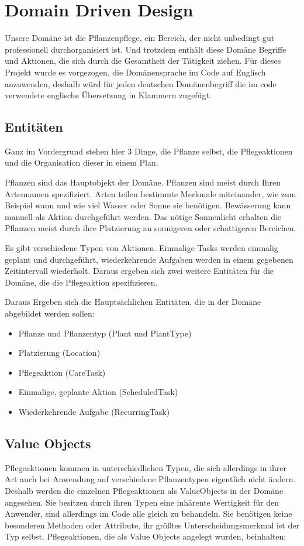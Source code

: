 \chapter{Domain Driven Design}
Unsere Domäne ist die Pflanzenpflege, ein Bereich, der nicht unbedingt gut professionell durchorganisiert ist. Und trotzdem enthält diese Domäne Begriffe und Aktionen, die sich durch die Gesamtheit der Tätigkeit ziehen. Für dieses Projekt wurde es vorgezogen, die Domänensprache im Code auf Englisch anzuwenden, deshalb würd für jeden deutschen Domänenbegriff die im code verwendete englische Übersetzung in Klammern zugefügt.

\section{Entitäten}
Ganz im Vordergrund stehen hier 3 Dinge, die Pflanze selbst, die Pflegeaktionen und die Organisation dieser in einem Plan.
\par
Pflanzen sind das Hauptobjekt der Domäne. Pflanzen sind meist durch Ihren Artennamen spezifiziert. Arten teilen bestimmte Merkmale miteinander, wie zum Beispiel wann und wie viel Wasser oder Sonne sie benötigen. Bewässerung kann manuell als Aktion durchgeführt werden.  Das nötige Sonnenlicht erhalten die Pflanzen meist durch ihre Platzierung an sonnigeren oder schattigeren Bereichen. 
\par
Es gibt verschiedene Typen von Aktionen. Einmalige Tasks werden einmalig geplant und durchgeführt, wiederkehrende Aufgaben werden in einem gegebenen Zeitintervall wiederholt. Daraus ergeben sich zwei weitere Entitäten für die Domäne, die die Pflegeaktion spezifizieren.
\par
Daraus Ergeben sich die Hauptsächlichen Entitäten, die in der Domäne abgebildet werden sollen:

\begin{itemize}
	\item Pflanze und Pflanzentyp (Plant und PlantType)
	\item Platzierung (Location)
	\item Pflegeaktion (CareTask)
	\item Einmalige, geplante Aktion (ScheduledTask)
	\item Wiederkehrende Aufgabe (RecurringTask)
\end{itemize}

\section{Value Objects}
Pflegeaktionen kommen in unterschiedlichen Typen, die sich allerdings in ihrer Art auch bei Anwendung auf verschiedene Pflanzentypen eigentlich nicht ändern. Deshalb werden die einzelnen Pflegeaktionen als ValueObjects in der Domäne angesehen. Sie besitzen durch ihren Typen eine inhärente Wertigkeit für den Anwender, sind allerdings im Code alle gleich zu behandeln.  Sie benötigen keine besonderen Methoden oder Attribute, ihr größtes Unterscheidungsmerkmal ist der Typ selbst. Pflegeaktionen, die als Value Objects angelegt wurden, beinhalten:

